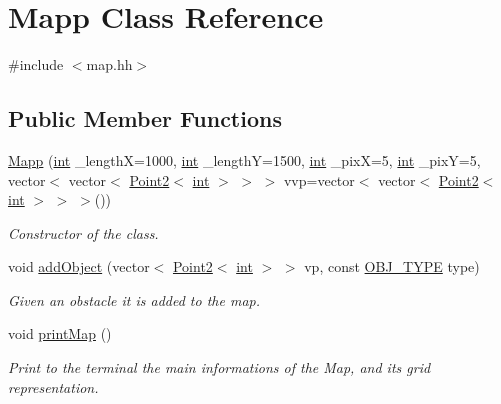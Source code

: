 \hypertarget{class_mapp}{}\section{Mapp Class Reference}
\label{class_mapp}


{\ttfamily \#include $<$map.\+hh$>$}

\subsection*{Public Member Functions}
\begin{DoxyCompactItemize}
\item 
\mbox{\hyperlink{class_mapp_a7f935f5a73c991b7911495af9147d2e9}{Mapp}} (\mbox{\hyperlink{draw_8hh_aa620a13339ac3a1177c86edc549fda9b}{int}} \+\_\+lengthX=1000, \mbox{\hyperlink{draw_8hh_aa620a13339ac3a1177c86edc549fda9b}{int}} \+\_\+lengthY=1500, \mbox{\hyperlink{draw_8hh_aa620a13339ac3a1177c86edc549fda9b}{int}} \+\_\+pixX=5, \mbox{\hyperlink{draw_8hh_aa620a13339ac3a1177c86edc549fda9b}{int}} \+\_\+pixY=5, vector$<$ vector$<$ \mbox{\hyperlink{class_point2}{Point2}}$<$ \mbox{\hyperlink{draw_8hh_aa620a13339ac3a1177c86edc549fda9b}{int}} $>$ $>$ $>$ vvp=vector$<$ vector$<$ \mbox{\hyperlink{class_point2}{Point2}}$<$ \mbox{\hyperlink{draw_8hh_aa620a13339ac3a1177c86edc549fda9b}{int}} $>$ $>$ $>$())
\begin{DoxyCompactList}\small\item\em Constructor of the class. \end{DoxyCompactList}\item 
void \mbox{\hyperlink{class_mapp_a0112f7e64403d099eb77a964ad9f9109}{add\+Object}} (vector$<$ \mbox{\hyperlink{class_point2}{Point2}}$<$ \mbox{\hyperlink{draw_8hh_aa620a13339ac3a1177c86edc549fda9b}{int}} $>$ $>$ vp, const \mbox{\hyperlink{map_8hh_a714b9c2c276fbae637fee36453d9121e}{O\+B\+J\+\_\+\+T\+Y\+PE}} type)
\begin{DoxyCompactList}\small\item\em Given an obstacle it is added to the map. \end{DoxyCompactList}\item 
void \mbox{\hyperlink{class_mapp_ab795b79c5d655f6a62303c4a415ee73c}{print\+Map}} ()
\begin{DoxyCompactList}\small\item\em Print to the terminal the main informations of the Map, and its grid representation. \end{DoxyCompactList}\item 

\end{DoxyCompactItemize}
